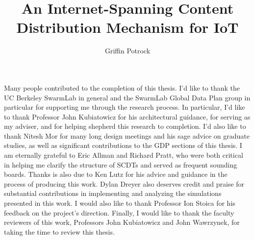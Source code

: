 \documentclass[masters]{ucbthesis}
\begin{document}

\title{An Internet-Spanning Content Distribution Mechanism for IoT}
\author{Griffin Potrock}




\maketitle
\approvalpage
\copyrightpage



\begin{frontmatter}


\tableofcontents
\clearpage
\listoffigures
\clearpage
\listoftables

\begin{acknowledgements}
Many people contributed to the completion of this thesis. I'd like to thank the UC Berkeley SwarmLab in general and the SwarmLab Global Data Plan group in particular for supporting me through the research process. In particular, I'd like to thank Professor John Kubiatowicz for his architectural guidance, for serving as my adviser, and for helping shepherd this research to completion. I'd also like to thank Nitesh Mor for many long design meetings and his sage advice on graduate studies, as well as significant contributions to the GDP sections of this thesis. I am eternally grateful to Eric Allman and Richard Pratt, who were both critical in helping me clarify the structure of SCDTs and served as frequent sounding boards. Thanks is also due to Ken Lutz for his advice and guidance in the process of producing this work. Dylan Dreyer also deserves credit and praise for substantial contributions in implementing and analyzing the simulations presented in this work.  I would also like to thank Professor Ion Stoica for his feedback on the project's direction.  Finally, I would like to thank the faculty reviewers of this work, Professors John Kubiatowicz and John Wawrzynek, for taking the time to review this thesis.
\end{acknowledgements}

\end{frontmatter}

\pagestyle{headings}










\printbibliography
\end{document}
